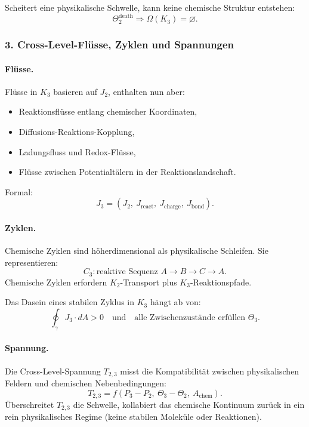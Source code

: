 Scheitert eine physikalische Schwelle, kann keine chemische Struktur entstehen:
\[
\Theta_2^{\mathrm{death}} \Rightarrow \Omega(K_3)=\varnothing.
\]

\subsubsection{3. Cross-Level-Flüsse, Zyklen und Spannungen}

\paragraph{Flüsse.}
Flüsse in $K_3$ basieren auf $J_2$, enthalten nun aber:
\begin{itemize}
  \item Reaktionsflüsse entlang chemischer Koordinaten,
  \item Diffusions-Reaktions-Kopplung,
  \item Ladungsfluss und Redox-Flüsse,
  \item Flüsse zwischen Potentialtälern in der Reaktionslandschaft.
\end{itemize}

Formal:
\[
J_3 = (J_2,\ J_{\mathrm{react}},\ J_{\mathrm{charge}},\ J_{\mathrm{bond}}).
\]

\paragraph{Zyklen.}
Chemische Zyklen sind höherdimensional als physikalische Schleifen. Sie
representieren:
\[
C_3 : \text{reaktive Sequenz } A \rightarrow B \rightarrow C \rightarrow A.
\]
Chemische Zyklen erfordern $K_2$-Transport plus $K_3$-Reaktionspfade.

Das Dasein eines stabilen Zyklus in $K_3$ hängt ab von:
\[
\oint_{\gamma} J_3 \cdot dA > 0
\quad\text{und}\quad
\text{alle Zwischenzustände erfüllen }\Theta_3.
\]

\paragraph{Spannung.}
Die Cross-Level-Spannung $T_{2,3}$ misst die Kompatibilität zwischen physikalischen
Feldern und chemischen Nebenbedingungen:
\[
T_{2,3} = f(P_3 - P_2,\ \Theta_3 - \Theta_2,\ A_{\mathrm{chem}}).
\]
Überschreitet $T_{2,3}$ die Schwelle, kollabiert das chemische Kontinuum zurück
in ein rein physikalisches Regime (keine stabilen Moleküle oder Reaktionen).

